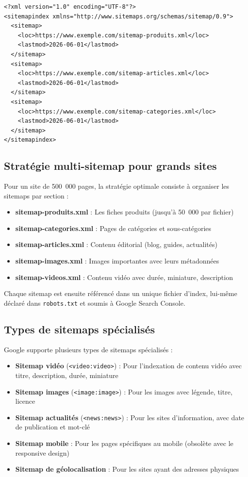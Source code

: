 \documentclass[12pt,a4paper,twoside]{report}
\begin{document}
\begin{lstlisting}[style=htmlcode,caption={Fichier d'index de sitemap pour grands sites}]
<?xml version="1.0" encoding="UTF-8"?>
<sitemapindex xmlns="http://www.sitemaps.org/schemas/sitemap/0.9">
  <sitemap>
    <loc>https://www.exemple.com/sitemap-produits.xml</loc>
    <lastmod>2026-06-01</lastmod>
  </sitemap>
  <sitemap>
    <loc>https://www.exemple.com/sitemap-articles.xml</loc>
    <lastmod>2026-06-01</lastmod>
  </sitemap>
  <sitemap>
    <loc>https://www.exemple.com/sitemap-categories.xml</loc>
    <lastmod>2026-06-01</lastmod>
  </sitemap>
</sitemapindex>
\end{lstlisting}

\subsection{Stratégie multi-sitemap pour grands sites}

Pour un site de 500~000 pages, la stratégie optimale consiste à organiser les sitemaps par section :
\begin{itemize}
    \item \textbf{sitemap-produits.xml} : Les fiches produits (jusqu'à 50~000 par fichier)
    \item \textbf{sitemap-categories.xml} : Pages de catégories et sous-catégories
    \item \textbf{sitemap-articles.xml} : Contenu éditorial (blog, guides, actualités)
    \item \textbf{sitemap-images.xml} : Images importantes avec leurs métadonnées
    \item \textbf{sitemap-videos.xml} : Contenu vidéo avec durée, miniature, description
\end{itemize}

Chaque sitemap est ensuite référencé dans un unique fichier d'index, lui-même déclaré dans \texttt{robots.txt} et soumis à Google Search Console.

\subsection{Types de sitemaps spécialisés}

Google supporte plusieurs types de sitemaps spécialisés :

\begin{itemize}
    \item \textbf{Sitemap vidéo} (\texttt{<video:video>}) : Pour l'indexation de contenu vidéo avec titre, description, durée, miniature
    \item \textbf{Sitemap images} (\texttt{<image:image>}) : Pour les images avec légende, titre, licence
    \item \textbf{Sitemap actualités} (\texttt{<news:news>}) : Pour les sites d'information, avec date de publication et mot-clé
    \item \textbf{Sitemap mobile} : Pour les pages spécifiques au mobile (obsolète avec le responsive design)
    \item \textbf{Sitemap de géolocalisation} : Pour les sites ayant des adresses physiques
\end{itemize}
\end{document}
